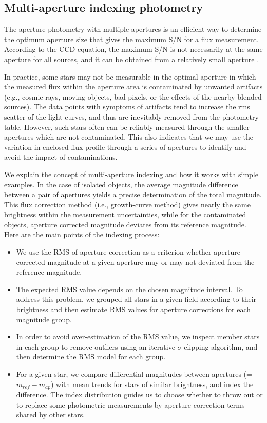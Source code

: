 \documentclass[11pt,twoside]{article}
\begin{document}
\subsection{Multi-aperture indexing photometry}
The aperture photometry with multiple apertures is an efficient way to determine the optimum aperture size that gives the maximum S/N for a flux measurement.  According to the CCD equation, the maximum S/N is not necessarily at the same aperture for all sources, and it can be obtained from a relatively small aperture \citep{how89}.

In practice, some stars may not be measurable in the optimal aperture in which the measured flux within the aperture area is contaminated by unwanted artifacts (e.g., cosmic rays, moving objects, bad pixels, or the effects of the nearby blended sources).  The data points with symptoms of artifacts tend to increase the rms scatter of the light curves, and thus are inevitably removed from the photometry table.  However, such stars often can be reliably measured through the smaller apertures which are not contaminated.  This also indicates that we may use the variation in enclosed flux profile through a series of apertures to identify and avoid the impact of contaminations.

We explain the concept of multi-aperture indexing and how it works with simple examples.  In the case of isolated objects, the average magnitude difference between a pair of apertures yields a precise determination of the total magnitude.  This flux correction method (i.e., growth-curve method) gives nearly the same brightness within the measurement uncertainties, while for the contaminated objects, aperture corrected magnitude deviates from its reference magnitude.    Here are the main points of the indexing process: \begin{itemize}
\item{We use the RMS of aperture correction as a criterion whether aperture corrected magnitude at a given aperture may or may not deviated from the reference magnitude.}

\item{The expected RMS value depends on the chosen magnitude interval.  To address this problem, we grouped all stars in a given field according to their brightness and then estimate RMS values for aperture corrections for each magnitude group.}

\item{In order to avoid over-estimation of the RMS value, we inspect member stars in each group to remove outliers using an iterative $\sigma$-clipping algorithm, and then determine the RMS model for each group.}

\item{For a given star, we compare differential magnitudes between apertures (=$m_{ref}-m_{ap}$) with mean trends for stars of similar brightness, and index the difference.  The index distribution guides us to choose whether to throw out or to replace some photometric measurements by aperture correction terms shared by other stars.}
\end{itemize}
\end{document}
